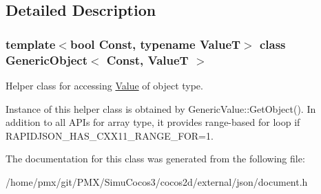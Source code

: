 \subsection{Detailed Description}
\subsubsection*{template$<$bool Const, typename ValueT$>$\newline
class Generic\+Object$<$ Const, Value\+T $>$}

Helper class for accessing \hyperlink{classValue}{Value} of object type. 

Instance of this helper class is obtained by {\ttfamily Generic\+Value\+::\+Get\+Object()}. In addition to all A\+P\+Is for array type, it provides range-\/based for loop if {\ttfamily R\+A\+P\+I\+D\+J\+S\+O\+N\+\_\+\+H\+A\+S\+\_\+\+C\+X\+X11\+\_\+\+R\+A\+N\+G\+E\+\_\+\+F\+OR=1}. 

The documentation for this class was generated from the following file\+:\begin{DoxyCompactItemize}
\item 
/home/pmx/git/\+P\+M\+X/\+Simu\+Cocos3/cocos2d/external/json/document.\+h\end{DoxyCompactItemize}
